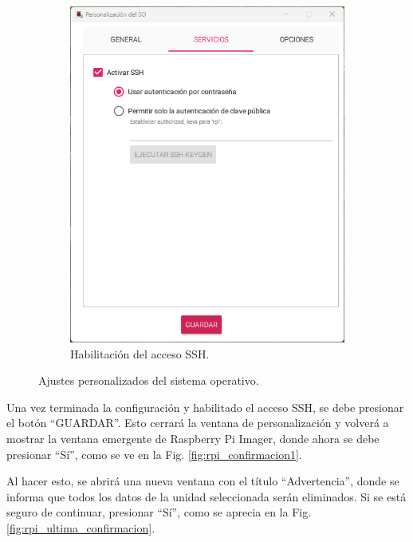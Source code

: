 \documentclass[12pt]{article}
\begin{document}
\begin{figure}[H]
\begin{subfigure}[b]{0.48\linewidth}
        \includegraphics[width=\linewidth]{rpi_ssh.png}
        \caption{Habilitación del acceso SSH.}
        \label{fig:rpi_ssh}
    \end{subfigure}
    \caption{Ajustes personalizados del sistema operativo.}
    \label{fig:rpi_config}
\end{figure}

Una vez terminada la configuración y habilitado el acceso SSH, se debe presionar el botón ``GUARDAR''. Esto cerrará la ventana de personalización y volverá a mostrar la ventana emergente de Raspberry Pi Imager, donde ahora se debe presionar ``Sí'', como se ve en la Fig. \ref{fig:rpi_confirmacion1}.

Al hacer esto, se abrirá una nueva ventana con el título ``Advertencia'', donde se informa que todos los datos de la unidad seleccionada serán eliminados. Si se está seguro de continuar, presionar ``Sí'', como se aprecia en la Fig. \ref{fig:rpi_ultima_confirmacion}.
\end{document}
